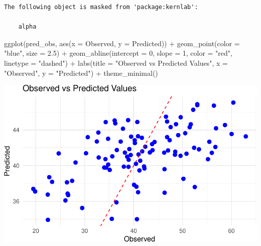 \documentclass[
  10pt,
]{article}
\newenvironment{Shaded}{\begin{snugshade}}{\end{snugshade}}
\newcommand{\AttributeTok}[1]{\textcolor[rgb]{0.40,0.45,0.13}{#1}}
\newcommand{\DecValTok}[1]{\textcolor[rgb]{0.68,0.00,0.00}{#1}}
\newcommand{\FloatTok}[1]{\textcolor[rgb]{0.68,0.00,0.00}{#1}}
\newcommand{\FunctionTok}[1]{\textcolor[rgb]{0.28,0.35,0.67}{#1}}
\newcommand{\NormalTok}[1]{\textcolor[rgb]{0.00,0.23,0.31}{#1}}
\newcommand{\SpecialCharTok}[1]{\textcolor[rgb]{0.37,0.37,0.37}{#1}}
\newcommand{\StringTok}[1]{\textcolor[rgb]{0.13,0.47,0.30}{#1}}
\begin{document}
\begin{verbatim}
The following object is masked from 'package:kernlab':

    alpha
\end{verbatim}

\begin{Shaded}
\begin{Highlighting}[]
\FunctionTok{ggplot}\NormalTok{(pred\_obs, }\FunctionTok{aes}\NormalTok{(}\AttributeTok{x =}\NormalTok{ Observed, }\AttributeTok{y =}\NormalTok{ Predicted)) }\SpecialCharTok{+}
  \FunctionTok{geom\_point}\NormalTok{(}\AttributeTok{color =} \StringTok{"blue"}\NormalTok{, }\AttributeTok{size =} \FloatTok{2.5}\NormalTok{) }\SpecialCharTok{+}
  \FunctionTok{geom\_abline}\NormalTok{(}\AttributeTok{intercept =} \DecValTok{0}\NormalTok{, }\AttributeTok{slope =} \DecValTok{1}\NormalTok{, }\AttributeTok{color =} \StringTok{"red"}\NormalTok{, }\AttributeTok{linetype =} \StringTok{"dashed"}\NormalTok{) }\SpecialCharTok{+}
  \FunctionTok{labs}\NormalTok{(}\AttributeTok{title =} \StringTok{"Observed vs Predicted Values"}\NormalTok{, }\AttributeTok{x =} \StringTok{"Observed"}\NormalTok{, }\AttributeTok{y =} \StringTok{"Predicted"}\NormalTok{) }\SpecialCharTok{+}
  \FunctionTok{theme\_minimal}\NormalTok{()}
\end{Highlighting}
\end{Shaded}

\includegraphics{551-HW-Q2_files/figure-pdf/unnamed-chunk-12-1.pdf}
\end{document}
